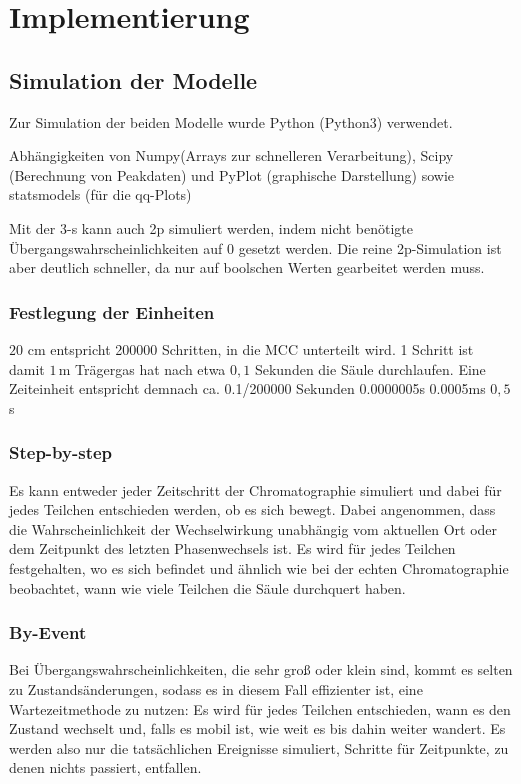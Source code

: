 
\chapter{Implementierung}
\label{chapter:imp}

\section{Simulation der Modelle}
Zur Simulation der beiden Modelle wurde Python (Python3) verwendet.

Abhängigkeiten von Numpy(Arrays zur schnelleren Verarbeitung), Scipy (Berechnung von Peakdaten) und PyPlot (graphische Darstellung) sowie statsmodels (für die qq-Plots)

Mit der 3-s kann auch 2p simuliert werden, indem nicht benötigte Übergangswahrscheinlichkeiten auf 0 gesetzt werden. Die reine 2p-Simulation ist aber deutlich schneller, da nur auf boolschen Werten gearbeitet werden muss.

\subsection{Festlegung der Einheiten}
$20$ cm entspricht 200000 Schritten, in die MCC unterteilt wird.
1 Schritt ist damit $1$\,\textmu m
Trägergas hat nach etwa $0,1$ Sekunden die Säule durchlaufen.
Eine Zeiteinheit entspricht demnach ca. 0.1/200000 Sekunden 0.0000005s 0.0005ms $0,5$\,\textmu s


\subsection{Step-by-step}
Es kann entweder jeder Zeitschritt der Chromatographie simuliert und dabei für jedes Teilchen entschieden werden, ob es sich bewegt. Dabei angenommen, dass die Wahrscheinlichkeit der Wechselwirkung unabhängig vom aktuellen Ort oder dem Zeitpunkt des letzten Phasenwechsels ist. Es wird für jedes Teilchen festgehalten, wo es sich befindet und ähnlich wie bei der echten Chromatographie beobachtet, wann wie viele Teilchen die Säule durchquert haben. 

\subsection{By-Event}
Bei Übergangswahrscheinlichkeiten, die sehr groß oder klein sind, kommt es selten zu Zustandsänderungen, sodass es in diesem Fall effizienter ist, eine Wartezeitmethode zu nutzen: Es wird für jedes Teilchen entschieden, wann es den Zustand wechselt und, falls es mobil ist, wie weit es bis dahin weiter wandert. Es werden also nur die tatsächlichen Ereignisse simuliert, Schritte für Zeitpunkte, zu denen nichts passiert, entfallen.

